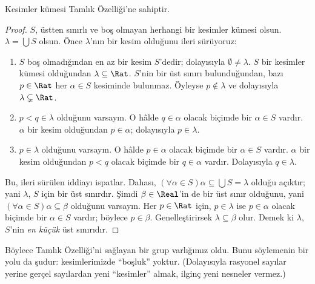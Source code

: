 \begin{thm}
Kesimler kümesi Tamlık Özelliği'ne sahiptir.
\end{thm}

\begin{proof}
$S$, üstten sınırlı ve boş olmayan herhangi bir kesimler kümesi olsun.
$\lambda = \bigcup S$ olsun.
Önce $\lambda$'nın bir kesim olduğunu ileri sürüyoruz:
\begin{enumerate}
\item $S$ boş olmadığından en az bir kesim $S$'dedir; dolayısıyla
$\emptyset \neq \lambda$. $S$ bir kesimler kümesi olduğundan
$\lambda \subseteq \Rat$. $S$'nin bir üst sınırı bulunduğundan, bazı
$p \in \Rat$ her $\alpha \in S$ kesiminde bulunmaz. Öyleyse
$p\notin \lambda$ ve dolayısıyla $\lambda \subsetneq \Rat$.
\item $p < q \in \lambda$ olduğunu varsayın. O hâlde $q \in \alpha$ olacak
biçimde bir $\alpha \in S$ vardır. $\alpha$ bir kesim olduğundan
$p \in \alpha$; dolayısıyla $p \in \lambda$.
\item $p \in \lambda$ olduğunu varsayın. O hâlde $p \in \alpha$ olacak
biçimde bir $\alpha \in S$ vardır. $\alpha$ bir kesim olduğundan
$p < q$ olacak biçimde bir $q \in \alpha$ vardır. Dolayısıyla
$q \in \lambda$.
\end{enumerate}
Bu, ileri sürülen iddiayı ispatlar. Dahası,
$(\forall \alpha \in S)\alpha \subseteq \bigcup S = \lambda$ olduğu açıktır;
yani $\lambda$, $S$ için bir üst sınırdır. Şimdi $\beta \in \Real$'in
de bir üst sınır olduğunu, yani
$(\forall \alpha \in S)\alpha \subseteq \beta$ olduğunu varsayın. Her
$p \in \Rat$ için, $p \in \lambda$ ise $p \in \alpha$ olacak biçimde bir
$\alpha \in S$ vardır; böylece $p \in \beta$. Genelleştirirsek
$\lambda \subseteq \beta$ olur. Demek ki $\lambda$, $S$'nin \emph{en küçük}
üst sınırıdır.
\end{proof}

Böylece Tamlık Özelliği'ni sağlayan bir grup varlığımız oldu. Bunu söylemenin
bir yolu da şudur: kesimlerimizde “boşluk” yoktur. (Dolayısıyla rasyonel
sayılar yerine gerçel sayılardan yeni “kesimler” almak, ilginç yeni nesneler
vermez.)

